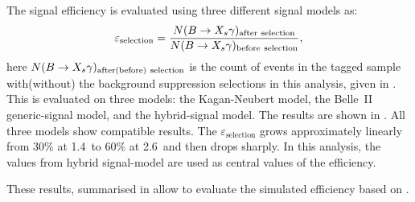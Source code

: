 The \BtoXsgamma signal efficiency is evaluated using three different signal models as:
\begin{equation}\label{eq:signal_efficiency}
    \varepsilon_{\mathrm{selection}} = \frac{N(\BtoXsgamma)_{\mathrm{after~selection}}}{N(\BtoXsgamma)_{\mathrm{before~selection}}},
\end{equation}
here $N(\BtoXsgamma)_{\mathrm{after(before)~selection}}$ is the count of \BtoXsgamma events in the \FEI tagged sample with(without) 
the background suppression selections in this analysis, given in .
This is evaluated on three models: the Kagan-Neubert model, the Belle~II generic-\MC signal model, and the hybrid-signal model.
The results are shown in .
All three models show compatible results.
The $\varepsilon_{\mathrm{selection}}$ grows approximately linearly from 30\% at 1.4~\gev to 60\% at 2.6~\gev and then drops sharply.
In this analysis, the values from hybrid signal-model are used as central values of the efficiency.

These results, summarised in  allow to evaluate the simulated efficiency based on .




